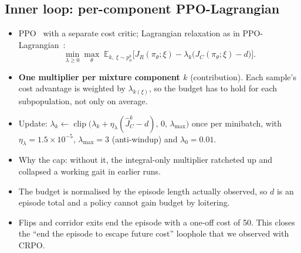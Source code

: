 \documentclass[sigconf,review]{acmart}
\begin{document}
\subsection{Inner loop: per-component PPO-Lagrangian}
\begin{itemize}
\item PPO~\cite{schulman2017proximal} with a separate cost critic; Lagrangian relaxation as in PPO-Lagrangian~\cite{ray2019benchmarking}:
\begin{equation}
\min_{\lambda \ge 0}\max_\theta\; \mathbb{E}_{k,\;\xi\sim p_\phi^{k}}\Big[J_R(\pi_\theta;\xi) - \lambda_k\big(J_C(\pi_\theta;\xi) - d\big)\Big].
\end{equation}
\item \textbf{One multiplier per mixture component $k$} (contribution). Each sample's cost advantage is weighted by $\lambda_{k(\xi)}$, so the budget has to hold for each subpopulation, not only on average.
\item Update: $\lambda_k \leftarrow \operatorname{clip}\big(\lambda_k + \eta_\lambda(\hat J_C^{k} - d),\,0,\,\lambda_{\max}\big)$ once per minibatch, with $\eta_\lambda = 1.5\times10^{-5}$, $\lambda_{\max} = 3$ (anti-windup) and $\lambda_0 = 0.01$.
\item Why the cap: without it, the integral-only multiplier ratcheted up and collapsed a working gait in earlier runs.
\item The budget is normalised by the episode length actually observed, so $d$ is an episode total and a policy cannot gain budget by loitering.
\item Flips and corridor exits end the episode with a one-off cost of 50. This closes the ``end the episode to escape future cost'' loophole that we observed with CRPO.
\end{itemize}
\end{document}
